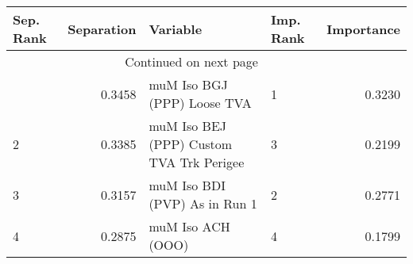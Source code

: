 \usepackage{lscape}

\begin{landscape}
\begin{longtable}{lrllr}
\toprule
Sep. Rank &  Separation &                                  Variable & Imp. Rank &  Importance \\
\midrule
\endhead
\midrule
\multicolumn{3}{r}{{Continued on next page}} \\
\midrule
\endfoot

\bottomrule
\endlastfoot
        1 &      0.3458 &               muM Iso BGJ (PPP) Loose TVA &         1 &      0.3230 \\
        2 &      0.3385 &  muM Iso BEJ (PPP) Custom TVA Trk Perigee &         3 &      0.2199 \\
        3 &      0.3157 &             muM Iso BDI (PVP) As in Run 1 &         2 &      0.2771 \\
        4 &      0.2875 &                         muM Iso ACH (OOO) &         4 &      0.1799 \\
\end{longtable}

\end{landscape}

